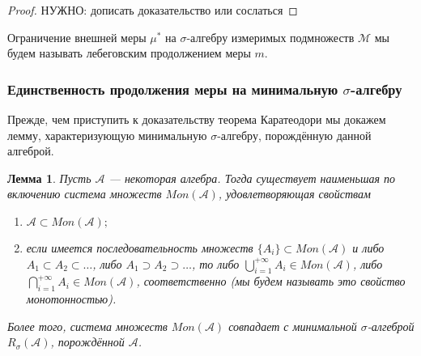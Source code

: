 \documentclass[12pt]{article}
\newtheorem{lemma}[theorem]{Лемма}
\numberwithin{theorem}{section}
\theoremstyle{definition}
\newcommand{\defin}[2]{\hypertarget{#2}{{\color{red} #1}}}
\newcommand{\calA}{\mathcal{A}}
\newcommand{\calM}{\mathcal{M}}
\newcommand{\TODO}[1]{\textcolor{todocolor}{НУЖНО: #1}}
\begin{document}
	\begin{proof}
		\TODO{дописать доказательство или сослаться}
	\end{proof}
	
	Ограничение внешней меры $ \mu^* $ на $ \sigma $-алгебру измеримых подмножеств $ \calM $ мы будем называть 
	\defin{лебеговским продолжением меры $ m $}{lebesgue-extention}.
	
	
	\subsubsection{Единственность продолжения меры на минимальную $ \sigma $-алгебру}
	
	Прежде, чем приступить к доказательству теорема Каратеодори мы докажем лемму, 
	характеризующую минимальную $ \sigma $-алгебру,
	порождённую данной алгеброй.
	
	\begin{lemma} \label{min sigma algebra monotonic characterization}
		Пусть $ \calA $ --- некоторая алгебра.
		Тогда существует наименьшая по включению система множеств $ Mon(\calA) $,
		удовлетворяющая свойствам
		 \begin{enumerate}
		 	\item $ \calA \subset Mon(\calA) ;$
		 	\item если имеется последовательность множеств $ \{A_i\} \subset Mon(\calA) $
		 	и либо $ A_1 \subset A_2 \subset \ldots $, либо $ A_1 \supset A_2 \supset \ldots $,
		 	то либо $ \bigcup\limits_{i = 1}^{+\infty} A_i \in Mon(\calA) $,
		 	либо $ \bigcap\limits_{i = 1}^{+\infty} A_i \in Mon(\calA) $, соответственно
		 	(мы будем называть это свойство \defin{монотонностью}{monotonic-class}).
		 \end{enumerate}
		 Более того, система множеств $ Mon(\calA) $ 
		 совпадает с минимальной $ \sigma $-алгеброй $ R_{\sigma}(\calA) $,
		 порождённой $ \calA $.
	\end{lemma}
	
\end{document}

